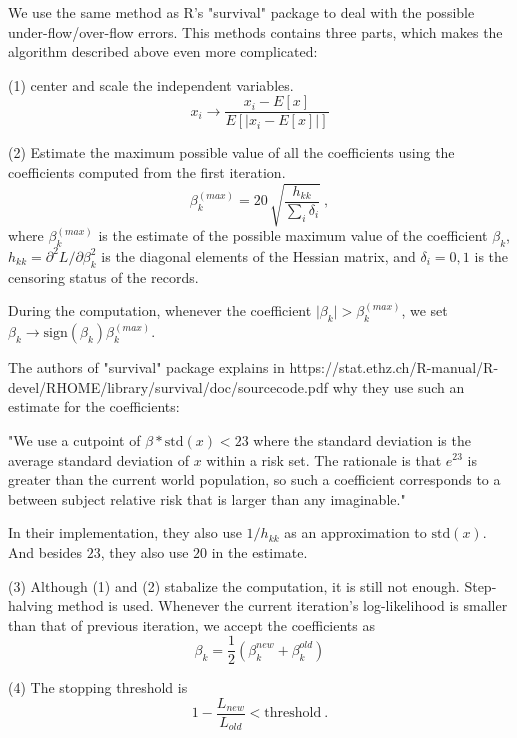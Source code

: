 We use the same method as R's "survival" package to deal with the
possible under-flow/over-flow errors. This methods contains three
parts, which makes the algorithm described above even more
complicated:

(1) center and scale the independent variables.
\begin{equation}
    x_i \rightarrow \frac{x_i - E[x]}{E[\vert x_i - E[x] \vert]}
\end{equation}

(2) Estimate the maximum possible value of all the coefficients using
the coefficients computed from the first iteration.
\begin{equation}
    \beta_k^{(max)} = 20 \, \sqrt{\frac{h_{kk}}{\sum_i \delta_i}}\ ,
\end{equation}
where $\beta_k^{(max)}$ is the estimate of the possible maximum value
of the coefficient $\beta_k$, $h_{kk} = \partial^2 L / \partial
\beta_k^2$ is the diagonal elements of the Hessian matrix, and
$\delta_i=0,1$ is the censoring status of the records.

During the computation, whenever the coefficient $\vert \beta_k \vert
> \beta_k^{(max)}$, we set $\beta_k \rightarrow \mbox{sign}(\beta_k)
\beta_k^{(max)}$.

The authors of "survival" package explains in
https://stat.ethz.ch/R-manual/R-devel/RHOME/library/survival/doc/sourcecode.pdf
why they use such an estimate for the coefficients:

"We use a cutpoint of $\beta * \mbox{std}(x) < 23$
where the standard deviation is the average standard deviation of $x$ within a risk
set. The rationale is that $e^{23}$ is greater than the current world
population, so such a coefficient corresponds to a between subject
relative risk that is larger than any imaginable."

In their implementation, they also use $1/h_{kk}$ as an approximation
to $\mbox{std}(x)$. And besides $23$, they also use $20$ in the
estimate.

(3) Although (1) and (2) stabalize the computation, it is still not
enough. Step-halving method is used. Whenever the current iteration's
log-likelihood is smaller than that of previous iteration, we accept
the coefficients as
\begin{equation}
    \beta_k = \frac{1}{2}(\beta_k^{new} + \beta_k^{old})
\end{equation}

(4) The stopping threshold is
\begin{equation}
    1 - \frac{L_{new}}{L_{old}} < \mbox{threshold}\ .
\end{equation}

